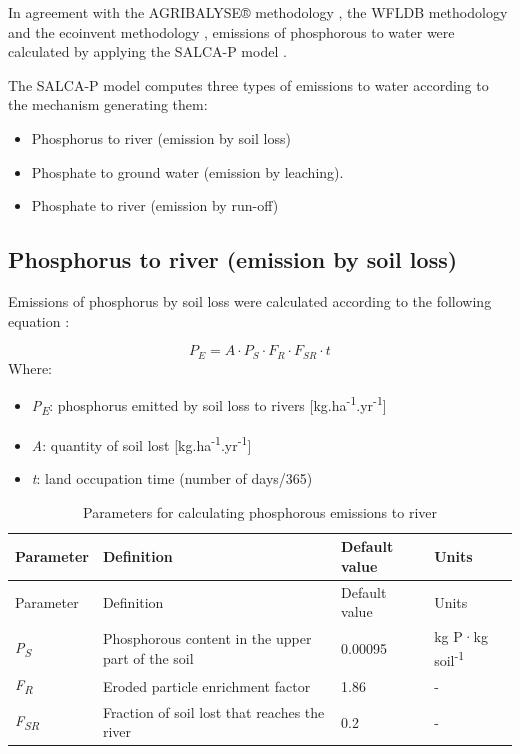 \documentclass[openany]{book}
\providecommand{\tightlist}{%
  \setlength{\itemsep}{0pt}\setlength{\parskip}{0pt}}
\begin{document}
In agreement with the AGRIBALYSE® methodology \citep{Koch2015}, the WFLDB methodology \citep{nemecek2014} and the ecoinvent methodology \citep{nemecek2011}, emissions of phosphorous to water were calculated by applying the SALCA-P model \citep{prasuhn2006}.

The SALCA-P model computes three types of emissions to water according to the mechanism generating them:

\begin{itemize}
\tightlist
\item
  Phosphorus to river (emission by soil loss)
\item
  Phosphate to ground water (emission by leaching).
\item
  Phosphate to river (emission by run-off)
\end{itemize}

\hypertarget{phosphorus-to-river-emission-by-soil-loss}{%
\subsection{Phosphorus to river (emission by soil loss)}\label{phosphorus-to-river-emission-by-soil-loss}}

Emissions of phosphorus by soil loss were calculated according to the following equation \citep{prasuhn2006}:

\[P_E=A \cdot P_S \cdot F_R \cdot F_{SR} \cdot t\]
Where:

\begin{itemize}
\item
  \emph{P\textsubscript{E}}: phosphorus emitted by soil loss to rivers {[}kg.ha\textsuperscript{-1}.yr\textsuperscript{-1}{]}
\item
  \emph{A}: quantity of soil lost {[}kg.ha\textsuperscript{-1}.yr\textsuperscript{-1}{]}
\item
  \emph{t}: land occupation time (number of days/365)
\end{itemize}

\begin{longtable}[]{@{}llll@{}}
\caption{\label{tab:phosphorous-river} Parameters for calculating phosphorous emissions to river \citep{prasuhn2006}}\tabularnewline
\toprule
Parameter & Definition & Default value & Units\tabularnewline
\midrule
\endfirsthead
\toprule
Parameter & Definition & Default value & Units\tabularnewline
\midrule
\endhead
\emph{P\textsubscript{S}} & Phosphorous content in the upper part of the soil & 0.00095 & kg P·kg soil\textsuperscript{-1}\tabularnewline
\emph{F\textsubscript{R}} & Eroded particle enrichment factor & 1.86 & -\tabularnewline
\emph{F\textsubscript{SR}} & Fraction of soil lost that reaches the river & 0.2 & -\tabularnewline
\bottomrule
\end{longtable}
\end{document}
